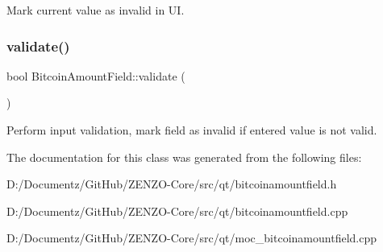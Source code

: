 Mark current value as invalid in UI. \mbox{\label{class_bitcoin_amount_field_a87e6f2d15150baf5962acf7d7151610d}} 
\subsubsection{\texorpdfstring{validate()}{validate()}}
{\footnotesize\ttfamily bool Bitcoin\+Amount\+Field\+::validate (\begin{DoxyParamCaption}{ }\end{DoxyParamCaption})}

Perform input validation, mark field as invalid if entered value is not valid. 

The documentation for this class was generated from the following files\+:\begin{DoxyCompactItemize}
\item 
D\+:/\+Documentz/\+Git\+Hub/\+Z\+E\+N\+Z\+O-\/\+Core/src/qt/bitcoinamountfield.\+h\item 
D\+:/\+Documentz/\+Git\+Hub/\+Z\+E\+N\+Z\+O-\/\+Core/src/qt/bitcoinamountfield.\+cpp\item 
D\+:/\+Documentz/\+Git\+Hub/\+Z\+E\+N\+Z\+O-\/\+Core/src/qt/moc\+\_\+bitcoinamountfield.\+cpp\end{DoxyCompactItemize}
